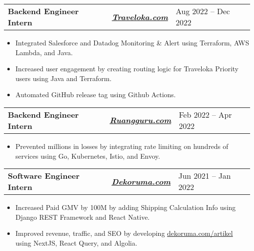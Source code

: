 \documentclass[letterpaper,11pt]{article}
\makeatletter
\newcommand{\resumeItem}[1]{
  \item\small{
    {#1 \vspace{-3pt} }
  }
}
\newcommand{\resumeSubheading}[4]{
  \vspace{-2pt}\item

    \begin{tabularx}{\textwidth}{X c >{\raggedleft}X}

        \textbf{#1} & \textit{\textbf{#3}} & #2
    \end{tabularx}\vspace{-7pt}
}
\newcommand{\resumeSubSubheading}[2]{
    \item
    \begin{tabular*}{\textwidth}{l@{\extracolsep{\fill}}r}
      \textit{\small#1} & \textit{\small #2} \\
    \end{tabular*}\vspace{-7pt}
}
\newcommand{\resumeSubHeadingListEnd}{\end{itemize}}
\newcommand{\resumeItemListStart}{\begin{itemize}[leftmargin=0.15in]}
\newcommand{\resumeItemListEnd}{\end{itemize}\vspace{-5pt}}
\makeatother
\begin{document}
    \resumeSubheading
      {Backend Engineer Intern} {Aug 2022 -- Dec 2022}
      {\href{https://www.traveloka.com/}{Traveloka.com}}{Jakarta, Indonesia}
      \resumeItemListStart
        \resumeItem{Integrated Salesforce and Datadog Monitoring \& Alert using Terraform, AWS Lambda, and Java.}
        \resumeItem{Increased user engagement by creating routing logic for Traveloka Priority users using Java and Terraform.}
        \resumeItem{Automated GitHub release tag using Github Actions.}
      \resumeItemListEnd
      
    \resumeSubheading
      {Backend Engineer Intern} {Feb 2022 -- Apr 2022}
      {\href{https://www.ruangguru.com/}{Ruangguru.com}}{Jakarta, Indonesia}
      \resumeItemListStart
        \resumeItem{Prevented millions in losses by integrating rate limiting on hundreds of services using Go, Kubernetes, Istio, and Envoy.}
      \resumeItemListEnd

    \resumeSubheading
      {Software Engineer Intern} {Jun 2021 -- Jan 2022}
      {\href{https://dekoruma.com}{Dekoruma.com}}{Jakarta, Indonesia}
      \resumeItemListStart
        \resumeItem{Increased Paid GMV by 100M by adding Shipping Calculation Info using Django REST Framework and React Native.}
        \resumeItem{Improved revenue, traffic, and SEO by developing {\href{https://dekoruma.com/artikel}{dekoruma.com/artikel}} using NextJS, React Query, and Algolia.}
      \resumeItemListEnd


      
\end{document}
